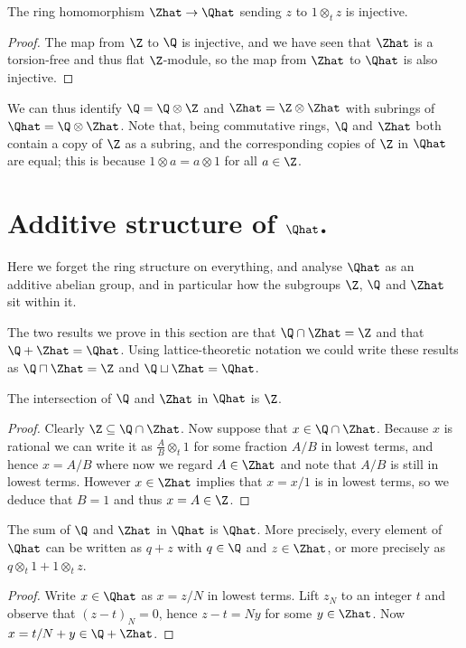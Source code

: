 \begin{lemma}
    \label{QHat.injective_zHat}
    \leanok
    The ring homomorphism $\Zhat\to\Qhat$ sending
    $z$ to $1\otimes_t z$ is injective.
\end{lemma}
\begin{proof} \leanok
    The map from $\Z$ to $\Q$ is injective, and we have seen
    that $\Zhat$ is a torsion-free and thus flat $\Z$-module,
    so the map from $\Zhat$ to $\Qhat$ is also injective.
\end{proof}

We can thus identify $\Q=\Q\otimes\Z$ and $\Zhat=\Z\otimes\Zhat$ with subrings of $\Qhat=\Q\otimes\Zhat$.
Note that, being commutative rings, $\Q$ and $\Zhat$ both contain a copy of $\Z$ as a subring, and
the corresponding copies of $\Z$ in $\Qhat$ are equal; this is because $1\otimes a=a\otimes 1$
for all $a\in\Z$.

\section{Additive structure of \texorpdfstring{$\Qhat$}{Qhat}.}

Here we forget the ring structure on everything, and analyse $\Qhat$ as an additive
abelian group, and in particular how the subgroups $\Z$, $\Q$ and $\Zhat$ sit within it.

The two results we prove in this section are that $\Q\cap\Zhat=\Z$ and
that $\Q+\Zhat=\Qhat$. Using lattice-theoretic notation we could write
these results as $\Q\sqcap\Zhat=\Z$ and $\Q\sqcup\Zhat=\Qhat$.

\begin{lemma}
    \label{QHat.rat_meet_zHat}
    \leanok
    The intersection of $\Q$ and $\Zhat$ in $\Qhat$ is $\Z$.
\end{lemma}
\begin{proof}
    \leanok
    Clearly $\Z\subseteq\Q\cap\Zhat$. Now suppose that $x\in\Q\cap\Zhat$.
    Because $x$ is rational we can write it as $\frac{A}{B}\otimes_t1$ for some
    fraction $A/B$ in lowest terms, and hence $x=A/B$ where now we regard $A\in\Zhat$
    and note that $A/B$ is still in lowest terms. However $x\in\Zhat$ implies that
    $x=x/1$ is in lowest terms, so we deduce that $B=1$ and thus $x=A\in\Z$.
\end{proof}

\begin{lemma}
    \label{QHat.rat_join_zHat}
    \leanok
    The sum of $\Q$ and $\Zhat$ in $\Qhat$ is $\Qhat$.
    More precisely, every element of $\Qhat$ can be written as $q+z$ with $q\in\Q$ and $z\in\Zhat$,
    or more precisely as $q\otimes_t 1+1\otimes_t z$.
\end{lemma}
\begin{proof}
    \leanok
    Write $x\in\Qhat$ as $x=z/N$ in lowest terms. Lift $z_N$ to an integer $t$ and observe
    that $(z-t)_N=0$, hence $z-t=Ny$ for some $y\in\Zhat$. Now $x=t/N+y\in\Q+\Zhat$.
\end{proof}

